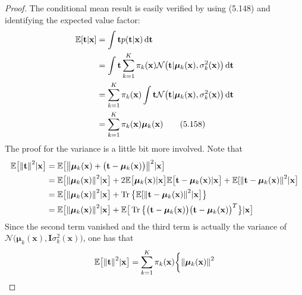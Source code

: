 \begin{proof}
    The conditional mean result is easily verified by using (5.148) and 
    identifying the expected value factor:
    \begin{align*}
        \mathbb{E}[\mathbf{t} | \mathbf{x}]
        &= \int \mathbf{t} p(\mathbf{t} | \mathbf{x}) \mathop{}\!\mathrm{d} \mathbf{t} \\
        &= \int \mathbf{t} \sum_{k=1}^{K} \pi_k(\mathbf{x}) 
            \mathcal{N}\big(\mathbf{t} | \bm{\mu}_k(\mathbf{x}), \sigma_k^2(\mathbf{x})\big) 
            \mathop{}\!\mathrm{d} \mathbf{t} \\
        &= \sum_{k=1}^{K} \pi_k(\mathbf{x}) \int \mathbf{t}
            \mathcal{N}\big(\mathbf{t} | \bm{\mu}_k(\mathbf{x}), \sigma_k^2(\mathbf{x})\big) 
            \mathop{}\!\mathrm{d} \mathbf{t} \\
        &= \sum_{k=1}^{K} \pi_k(\mathbf{x}) \bm{\mu}_k(\mathbf{x})
        \tag{5.158}\label{eq:5.158}
    \end{align*}
    The proof for the variance is a little bit more involved. Note that
    \begin{align*}
        \mathbb{E}\big[\norm{\mathbf{t}}^2 | \mathbf{x}\big]
        &= \mathbb{E}\big[\norm{\bm{\mu}_k(\mathbf{x}) + 
            \big(\mathbf{t} - \bm{\mu}_k(\mathbf{x})\big)}^2 | \mathbf{x}\big] \\
        &= \mathbb{E}\big[\norm{\bm{\mu}_k(\mathbf{x})}^2 | \mathbf{x}\big]
            + 2\mathbb{E}\big[\bm{\mu}_k(\mathbf{x}) | \mathbf{x}\big]\mathbb{E}\big[\mathbf{t} 
            - \bm{\mu}_k(\mathbf{x}) | \mathbf{x}\big] 
            + \mathbb{E}[\norm{\mathbf{t} - \bm{\mu}_k(\mathbf{x})}^2 | \mathbf{x}\big] \\
        &= \mathbb{E}\big[\norm{\bm{\mu}_k(\mathbf{x})}^2 | \mathbf{x}\big]
            + \Tr\big\{\mathbb{E}[\norm{\mathbf{t} 
                - \bm{\mu}_k(\mathbf{x})}^2 | \mathbf{x}\big]\big\} \\
        &= \mathbb{E}\big[\norm{\bm{\mu}_k(\mathbf{x})}^2 | \mathbf{x}\big] 
            + \mathbb{E}\big[\Tr\big\{\big(\mathbf{t} 
            - \bm{\mu}_k(\mathbf{x})\big)\big(\mathbf{t} - \bm{\mu}_k(\mathbf{x})\big)^T\big\}
            | \mathbf{x}\big]
    \end{align*}
    Since the second term vanished and the third term is actually the variance
    of $\mathcal{N}\big(\bm{\mu}_k(\mathbf{x}), \mathbf{I}\sigma_k^2(\mathbf{x})\big)$,
    one has that
    \[
        \mathbb{E}\big[\norm{\mathbf{t}}^2 | \mathbf{x}\big]
        = \sum_{k=1}^{K} \pi_k(\mathbf{x}) \bigg\{\norm{\bm{\mu}_k(\mathbf{x})}^2 
\]
\end{proof}
